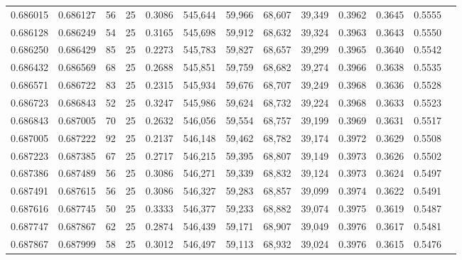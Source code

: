 \begin{tabular}{rrrrrrrrrrrrr}
0.686015 & 0.686127 &    56 &  25 &                                     0.3086 & 545,644 &  59,966 &  68,607 &  39,349 & 0.3962 & 0.3645 & 0.5555 \\
0.686128 & 0.686249 &    54 &  25 &                                     0.3165 & 545,698 &  59,912 &  68,632 &  39,324 & 0.3963 & 0.3643 & 0.5550 \\
0.686250 & 0.686429 &    85 &  25 &                                     0.2273 & 545,783 &  59,827 &  68,657 &  39,299 & 0.3965 & 0.3640 & 0.5542 \\
0.686432 & 0.686569 &    68 &  25 &                                     0.2688 & 545,851 &  59,759 &  68,682 &  39,274 & 0.3966 & 0.3638 & 0.5535 \\
0.686571 & 0.686722 &    83 &  25 &                                     0.2315 & 545,934 &  59,676 &  68,707 &  39,249 & 0.3968 & 0.3636 & 0.5528 \\
0.686723 & 0.686843 &    52 &  25 &                                     0.3247 & 545,986 &  59,624 &  68,732 &  39,224 & 0.3968 & 0.3633 & 0.5523 \\
0.686843 & 0.687005 &    70 &  25 &                                     0.2632 & 546,056 &  59,554 &  68,757 &  39,199 & 0.3969 & 0.3631 & 0.5517 \\
0.687005 & 0.687222 &    92 &  25 &                                     0.2137 & 546,148 &  59,462 &  68,782 &  39,174 & 0.3972 & 0.3629 & 0.5508 \\
0.687223 & 0.687385 &    67 &  25 &                                     0.2717 & 546,215 &  59,395 &  68,807 &  39,149 & 0.3973 & 0.3626 & 0.5502 \\
0.687386 & 0.687489 &    56 &  25 &                                     0.3086 & 546,271 &  59,339 &  68,832 &  39,124 & 0.3973 & 0.3624 & 0.5497 \\
0.687491 & 0.687615 &    56 &  25 &                                     0.3086 & 546,327 &  59,283 &  68,857 &  39,099 & 0.3974 & 0.3622 & 0.5491 \\
0.687616 & 0.687745 &    50 &  25 &                                     0.3333 & 546,377 &  59,233 &  68,882 &  39,074 & 0.3975 & 0.3619 & 0.5487 \\
0.687747 & 0.687867 &    62 &  25 &                                     0.2874 & 546,439 &  59,171 &  68,907 &  39,049 & 0.3976 & 0.3617 & 0.5481 \\
0.687867 & 0.687999 &    58 &  25 &                                     0.3012 & 546,497 &  59,113 &  68,932 &  39,024 & 0.3976 & 0.3615 & 0.5476 \\

\end{tabular}
